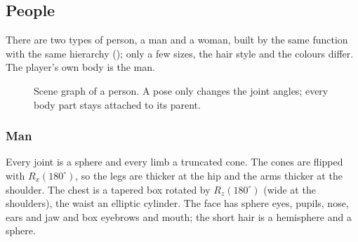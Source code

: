 \subsection{People}\label{sec:humans}
There are two types of person, a man and a woman, built by the same function with the same hierarchy
(); only a few sizes, the hair style and the colours differ. The player's own body is the man.
\begin{figure}[H]
\centering
{}
\caption{Scene graph of a person. A pose only changes the joint angles; every body part stays attached to its parent.}\label{fig:humangraph}
\end{figure}

\subsubsection{Man}

 Every joint is a sphere and every limb a truncated cone. The cones are flipped with
$R_x(180^\circ)$, so the legs are thicker at the hip and the arms thicker at the shoulder. The chest is a tapered
box rotated by $R_z(180^\circ)$ (wide at the shoulders), the waist an elliptic cylinder. The face has sphere eyes,
pupils, nose, ears and jaw and box eyebrows and mouth; the short hair is a hemisphere and a sphere.

